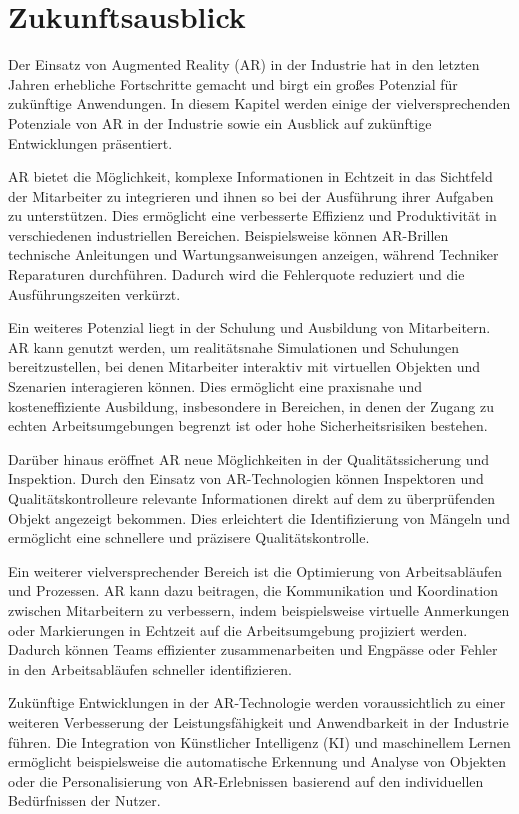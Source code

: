 \section{Zukunftsausblick}

Der Einsatz von Augmented Reality (AR) in der Industrie hat in den letzten
Jahren erhebliche Fortschritte gemacht und birgt ein großes Potenzial für
zukünftige Anwendungen. In diesem Kapitel werden einige der vielversprechenden
Potenziale von AR in der Industrie sowie ein Ausblick auf zukünftige
Entwicklungen präsentiert.

AR bietet die Möglichkeit, komplexe Informationen in Echtzeit in das Sichtfeld
der Mitarbeiter zu integrieren und ihnen so bei der Ausführung ihrer Aufgaben
zu unterstützen. Dies ermöglicht eine verbesserte Effizienz und Produktivität
in verschiedenen industriellen Bereichen. Beispielsweise können AR-Brillen
technische Anleitungen und Wartungsanweisungen anzeigen, während Techniker
Reparaturen durchführen. Dadurch wird die Fehlerquote reduziert und die
Ausführungszeiten verkürzt.

Ein weiteres Potenzial liegt in der Schulung und Ausbildung von Mitarbeitern.
AR kann genutzt werden, um realitätsnahe Simulationen und Schulungen
bereitzustellen, bei denen Mitarbeiter interaktiv mit virtuellen Objekten und
Szenarien interagieren können. Dies ermöglicht eine praxisnahe und
kosteneffiziente Ausbildung, insbesondere in Bereichen, in denen der Zugang zu
echten Arbeitsumgebungen begrenzt ist oder hohe Sicherheitsrisiken bestehen.

Darüber hinaus eröffnet AR neue Möglichkeiten in der Qualitätssicherung und
Inspektion. Durch den Einsatz von AR-Technologien können Inspektoren und
Qualitätskontrolleure relevante Informationen direkt auf dem zu überprüfenden
Objekt angezeigt bekommen. Dies erleichtert die Identifizierung von Mängeln und
ermöglicht eine schnellere und präzisere Qualitätskontrolle.

Ein weiterer vielversprechender Bereich ist die Optimierung von Arbeitsabläufen
und Prozessen. AR kann dazu beitragen, die Kommunikation und Koordination
zwischen Mitarbeitern zu verbessern, indem beispielsweise virtuelle Anmerkungen
oder Markierungen in Echtzeit auf die Arbeitsumgebung projiziert werden.
Dadurch können Teams effizienter zusammenarbeiten und Engpässe oder Fehler in
den Arbeitsabläufen schneller identifizieren.

Zukünftige Entwicklungen in der AR-Technologie werden voraussichtlich zu einer
weiteren Verbesserung der Leistungsfähigkeit und Anwendbarkeit in der Industrie
führen. Die Integration von Künstlicher Intelligenz (KI) und maschinellem
Lernen ermöglicht beispielsweise die automatische Erkennung und Analyse von
Objekten oder die Personalisierung von AR-Erlebnissen basierend auf den
individuellen Bedürfnissen der Nutzer.

